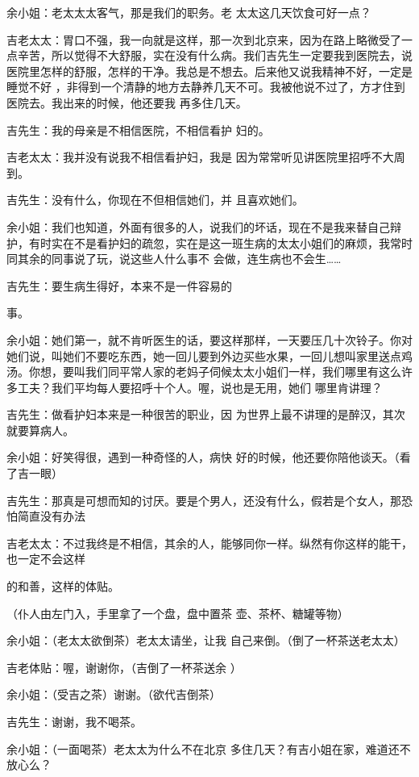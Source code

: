 \documentclass{article}
\begin{document}
余小姐：老太太太客气，那是我们的职务。老
太太这几天饮食可好一点？ 

吉老太太：胃口不强，我一向就是这样，那一次到北京来，因为在路上略微受了一点辛苦，所以觉得不大舒服，实在没有什么病。我们吉先生一定要我到医院去，说医院里怎样的舒服，怎样的干净。我总是不想去。后来他又说我精神不好，一定是睡觉不好
\newpage
，非得到一个清静的地方去静养几天不可。我被他说不过了，方才住到医院去。我出来的时候，他还要我
再多住几天。 

吉先生：我的母亲是不相信医院，不相信看护
妇的。 

吉老太太：我并没有说我不相信看护妇，我是
因为常常听见讲医院里招呼不大周到。 

吉先生：没有什么，你现在不但相信她们，并
且喜欢她们。 

余小姐：我们也知道，外面有很多的人，说我们的坏话，现在不是我来替自己辩护，有时实在不是看护妇的疏忽，实在是这一班生病的太太小姐们的麻烦，我常时同其余的同事说了玩，说这些人什么事不
会做，连生病也不会生…… 

吉先生：要生病生得好，本来不是一件容易的

\newpage
事。 

余小姐：她们第一，就不肯听医生的话，要这样那样，一天要压几十次铃子。你对她们说，叫她们不要吃东西，她一回儿要到外边买些水果，一回儿想叫家里送点鸡汤。你想，要叫我们同平常人家的老妈子伺候太太小姐们一样，我们哪里有这么许多工夫？我们平均每人要招呼十个人。喔，说也是无用，她们
哪里肯讲理？ 

吉先生：做看护妇本来是一种很苦的职业，因
为世界上最不讲理的是醉汉，其次就要算病人。 

余小姐：好笑得很，遇到一种奇怪的人，病快
好的时候，他还要你陪他谈天。（看了吉一眼） 

吉先生：那真是可想而知的讨厌。要是个男人，还没有什么，假若是个女人，那恐怕简直没有办法

吉老太太：不过我终是不相信，其余的人，能够同你一样。纵然有你这样的能干，也一定不会这样

\newpage
的和善，这样的体贴。 

（仆人由左门入，手里拿了一个盘，盘中置茶
壶、茶杯、糖罐等物） 


余小姐：（老太太欲倒茶）老太太请坐，让我
自己来倒。（倒了一杯茶送老太太） 

吉老体贴：喔，谢谢你，（吉倒了一杯茶送余
） 

余小姐：（受吉之茶）谢谢。（欲代吉倒茶）


吉先生：谢谢，我不喝茶。 

余小姐：（一面喝茶）老太太为什么不在北京
多住几天？有吉小姐在家，难道还不放心么？ 
\end{document}
